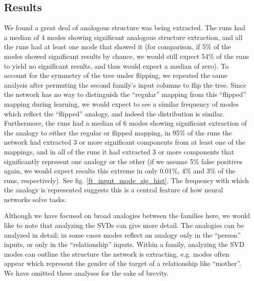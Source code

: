 \documentclass[10pt,letterpaper]{article}
\begin{document}
\subsection{Results}
We found a great deal of analogous structure was being extracted. The runs had a median of 4 modes showing significant analogous structure extraction, and all the runs had at least one mode that showed it (for comparison, if 5\% of the modes showed significant results by chance, we would still expect 54\% of the runs to yield no significant results, and thus would expect a median of zero). To account for the symmetry of the tree under flipping, we repeated the same analysis after permuting the second family's input columns to flip the tree. Since the network has no way to distinguish the ``regular'' mapping from this ``flipped'' mapping during learning, we would expect to see a similar frequency of modes which reflect the ``flipped'' analogy, and indeed the distribution is similar. Furthermore, the runs had a median of 6 modes showing significant extraction of the analogy to either the regular or flipped mapping, in 95\% of the runs the network had extracted 3 or more significant components from at least one of the mappings, and in all of the runs it had extracted 3 or more components that significantly represent one analogy or the other (if we assume 5\% false positives again, we would expect results this extreme in only 0.01\%, 4\% and 3\% of the runs, respectively). See fig. \ref{ft_input_mode_sig_hist}. The frequency with which the analogy is represented suggests this is a central feature of how neural networks solve tasks. \par
Although we have focused on broad analogies between the families here, we would like to note that analyzing the SVDs can give more detail. The analogies can be analyzed in detail; in some cases modes reflect an analogy only in the ``person'' inputs, or only in the ``relationship'' inputs. Within a family, analyzing the SVD modes can outline the structure the network is extracting, e.g. modes often appear which represent the gender of the target of a relationship like ``mother''. We have omitted these analyses for the sake of brevity. \par 
\end{document}
